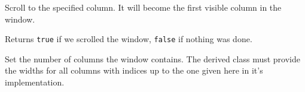 \label{wxvarhscrollhelperscrolltocolumn}


Scroll to the specified column. It will become the first visible column in the window.

Returns {\tt true} if we scrolled the window, {\tt false} if nothing was done.


\label{wxvarhscrollhelpersetcolumncount}


Set the number of columns the window contains. The derived class must provide
the widths for all columns with indices up to the one given here in it's
 implementation.



